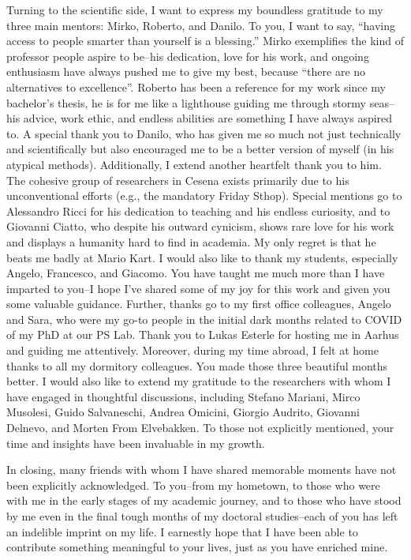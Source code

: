 Turning to the scientific side, 
 I want to express my boundless gratitude to my three main mentors: Mirko, Roberto, and Danilo. 
 To you, I want to say, ``having access to people smarter than yourself is a blessing.'' 
% 
Mirko exemplifies the kind of professor people aspire to be--his dedication, love for his work, 
 and ongoing enthusiasm have always pushed me to give my best, because ``there are no alternatives to excellence''. 
 Roberto has been a reference for my work since my bachelor's thesis, 
 he is for me like a lighthouse guiding me through stormy seas--his advice, work ethic, and endless abilities are something I have always aspired to. 
 A special thank you to Danilo, 
 who has given me so much not just technically and scientifically 
 but also encouraged me to be a better version of myself (in his atypical methods).
 Additionally, I extend another heartfelt thank you to him. The cohesive group of researchers in Cesena exists primarily due to his unconventional efforts (e.g., the mandatory Friday Sthop).
%
Special mentions go to Alessandro Ricci for his dedication to teaching and his endless curiosity, 
 and to Giovanni Ciatto, who despite his outward cynicism, shows rare love for his work and displays a humanity hard to find in academia. 
 My only regret is that he beats me badly at Mario Kart.
%
I would also like to thank my students, especially Angelo, Francesco, and Giacomo. 
 You have taught me much more than I have imparted to you--I hope I've shared some of my joy for this work and given you some valuable guidance.
%
Further, thanks go to my first office colleagues, Angelo and Sara, who were my go-to people in the initial dark months related to COVID of my PhD at our PS Lab.
%
Thank you to Lukas Esterle for hosting me in Aarhus and guiding me attentively. 
Moreover, during my time abroad, I felt at home thanks to all my dormitory colleagues. 
You made those three beautiful months better.
%
I would also like to extend my gratitude to the researchers with whom I have engaged in thoughtful discussions, including Stefano Mariani, Mirco Musolesi, Guido Salvaneschi, Andrea Omicini, Giorgio Audrito, Giovanni Delnevo, and Morten From Elvebakken. To those not explicitly mentioned, your time and insights have been invaluable in my growth.

In closing, 
 many friends with whom I have shared memorable moments have not been explicitly acknowledged. 
 To you--from my hometown, to those who were with me in the early stages of my academic journey, and to those who have stood by me even in the final tough months of my doctoral studies--each of you has left an indelible imprint on my life. 
 I earnestly hope that I have been able to contribute something meaningful to your lives, just as you have enriched mine.